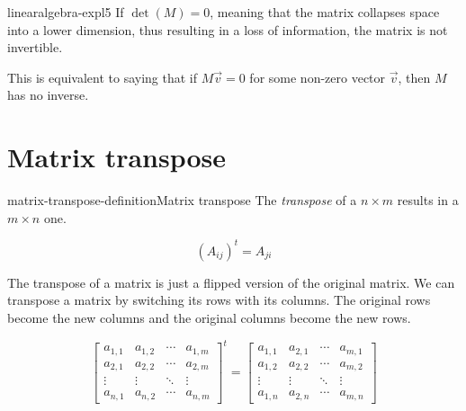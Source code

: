 \documentclass[preview]{standalone}
\begin{document}


\begin{snippet}{linearalgebra-expl5}
If \(\det(M) = 0\), meaning that the matrix collapses space into a lower dimension,
thus resulting in a loss of information, the matrix is not invertible.

This is equivalent to saying that if \(M\vec{v}=0\) for some non-zero vector \(\vec{v}\),
then \(M\) has no inverse.
\end{snippet}


\section{Matrix transpose}

\begin{snippetdefinition}{matrix-transpose-definition}{Matrix transpose}
    The \textit{transpose} of a \(n \times m\) \matrix results in a \(m \times n\) one.

    \[
        {\left(A_{ij}\right)}^t=A_{ji}
    \]
    
    The transpose of a matrix is just a flipped version of the original matrix.
    We can transpose a matrix by switching its rows with its columns.
    The original rows become the new columns and the original columns become the new rows.
    
    \[
        {\begin{bmatrix} 
            a_{1,1} & a_{1,2} & \cdots & a_{1,m} \\
            a_{2,1} & a_{2,2} & \cdots & a_{2,m} \\
            \vdots  & \vdots  & \ddots & \vdots  \\
            a_{n,1} & a_{n,2} & \cdots & a_{n,m} 
        \end{bmatrix}}^t
        =
        \begin{bmatrix} 
            a_{1,1} & a_{2,1} & \cdots & a_{m,1} \\
            a_{1,2} & a_{2,2} & \cdots & a_{m,2} \\
            \vdots  & \vdots  & \ddots & \vdots  \\
            a_{1,n} & a_{2,n} & \cdots & a_{m,n} 
        \end{bmatrix}
    \]
\end{snippetdefinition}
\end{document}

